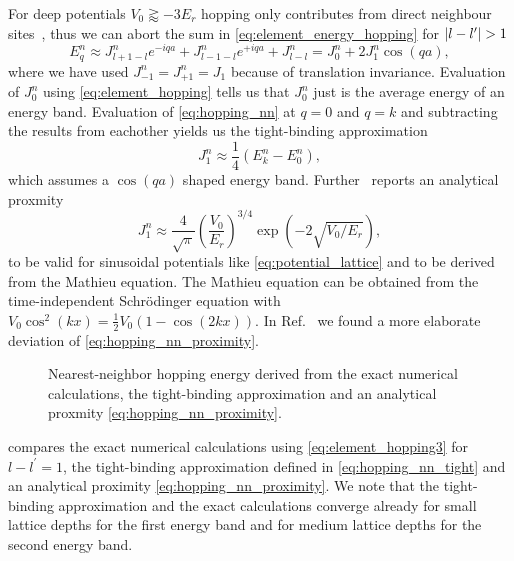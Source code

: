 For deep potentials $V_0\gtrapprox-3E_r$ hopping only contributes from direct
neighbour sites~\cite{Rom2009}, thus we can abort the sum in
\cref{eq:element_energy_hopping} for $\abs{l-l^\prime}>1$
\begin{equation}
  E^n_q
  \approx J^n_{l+1-l}e^{-iqa}+J^n_{l-1-l}e^{+iqa}+J^n_{l-l}
  =J^n_0+2J^n_1\cos(qa)
  \label{eq:hopping_nn},
\end{equation}
where we have used $J^n_{-1}=J^n_{+1}=J_1$ because of translation invariance.
Evaluation of $J^n_0$ using \cref{eq:element_hopping} tells us that $J^n_0$
just is the average energy of an energy band. Evaluation of
\cref{eq:hopping_nn} at $q=0$ and $q=k$ and subtracting the results from
eachother yields us the tight-binding approximation
\begin{equation}
  J^n_1\approx\frac{1}{4}\left(E^n_k-E^n_0\right)
  \label{eq:hopping_nn_tight},
\end{equation}
which assumes a $\cos(qa)$ shaped energy band. Further~\cite{Bloch2008}
reports an analytical proxmity
\begin{equation}
  J^n_1\approx
  \frac{4}{\sqrt{\pi}}\left(\frac{V_0}{E_r}\right)^{3/4}\exp(-2\sqrt{V_0/E_r})
  \label{eq:hopping_nn_proximity},
\end{equation}
to be valid for sinusoidal potentials like \cref{eq:potential_lattice} and
to be derived from the Mathieu equation. The Mathieu equation can be obtained
from the time-independent Schrödinger equation with
$V_0\cos^2(kx)=\frac{1}{2}V_0\left(1-\cos(2kx)\right)$.
In Ref.~\cite{Connor1984} we found a more elaborate deviation of
\cref{eq:hopping_nn_proximity}.
\begin{figure}[htb]
  \centering
  \begin{adjustbox}{width=\textwidth}
    
  \end{adjustbox}
  \caption{Nearest-neighbor hopping energy derived from the exact numerical
    calculations, the tight-binding approximation and an analytical proxmity
    \cref{eq:hopping_nn_proximity}.
  }\label{fig:scale_hopping_nn}
\end{figure}
 compares the exact numerical calculations using
\cref{eq:element_hopping3} for $l-l^\prime=1$, the tight-binding approximation
defined in \cref{eq:hopping_nn_tight} and an analytical proximity
\cref{eq:hopping_nn_proximity}. We note that the tight-binding approximation
and the exact calculations converge already for small lattice depths for the
first energy band and for medium lattice depths for the second energy band.

